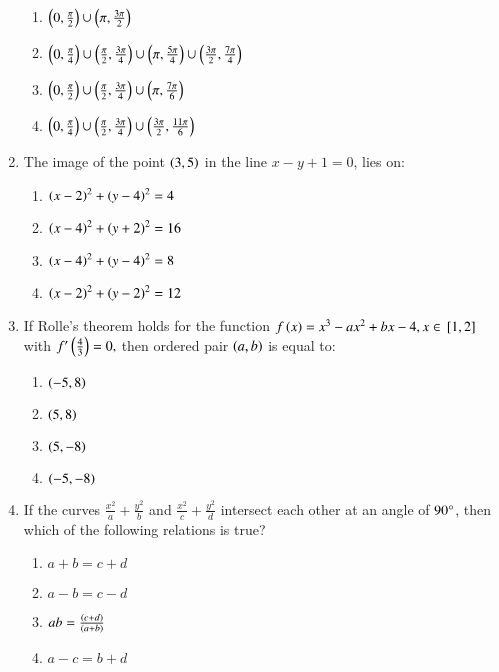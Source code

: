 \documentclass[journal,12pt,twocolumn]{IEEEtran}
\theoremstyle{remark}
\begin{document}
\begin{enumerate}
\begin{enumerate}
    \item $\left(0,\frac{\pi}{2}\right)\cup\left(\pi,\frac{3\pi}{2}\right)$
    \item $\left(0,\frac{\pi}{4}\right)\cup\left(\frac{\pi}{2},\frac{3\pi}{4}\right)\cup\left(\pi,\frac{5\pi}{4}\right)\cup\left(\frac{3\pi}{2},\frac{7\pi}{4}\right)$
    \item $\left(0,\frac{\pi}{2}\right)\cup\left(\frac{\pi}{2},\frac{3\pi}{4}\right)\cup\left(\pi,\frac{7\pi}{6}\right)$
    \item $\left(0,\frac{\pi}{4}\right)\cup\left(\frac{\pi}{2},\frac{3\pi}{4}\right)\cup\left(\frac{3\pi}{2},\frac{11\pi}{6}\right)$
\end{enumerate}
\item The image of the point $\left(3,5\right)$ in the line $x-y+1=0$, lies on$\colon$
\begin{enumerate}
    \item $\left(x-2\right)^{2}+\left(y-4\right)^{2}=4$
    \item $\left(x-4\right)^{2}+\left(y+2\right)^{2}=16$
    \item $\left(x-4\right)^{2}+\left(y-4\right)^{2}=8$
    \item $\left(x-2\right)^{2}+\left(y-2\right)^{2}=12$
\end{enumerate}
\item If Rolle's theorem holds for the function $f\left(x\right)=x^{3}-ax^{2}+bx-4, x \in {}\left[1,2\right]$ with $f^{\prime}\left(\frac{4}{3}\right)=0,$ then ordered pair $\left(a,b\right)$ is equal to$\colon$
\begin{enumerate}
    \item $\left(-5,8\right)$
    \item $\left(5,8\right)$
    \item $\left(5,-8\right)$
    \item $\left(-5,-8\right)$
\end{enumerate}
\item If the curves $\frac{x^{2}}{a}+\frac{y^{2}}{b}$ and $\frac{x^{2}}{c}+\frac{y^{2}}{d}$ intersect each other at an angle of $90\degree$, then which of the following relations is true?
\begin{enumerate}
    \item $a+b=c+d$
    \item $a-b=c-d$
    \item $ab=\frac{\left(c+d\right)}{\left(a+b\right)}$
    \item $a-c=b+d$
\end{enumerate}




























\end{enumerate}
\end{document}
